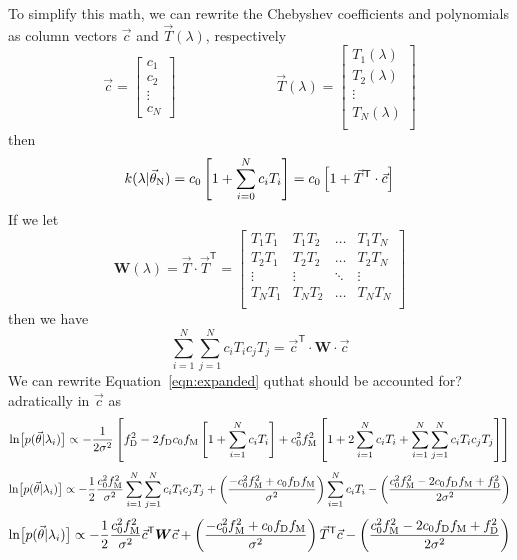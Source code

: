 \documentclass[preprint]{aastex} %
\newcommand{\vt}{\vec{\theta}}
\newcommand{\vN}{\vt_{\rm N}}
\newcommand{\vc}{\vec{c}}
\newcommand{\fM}{f_{\rm M}}
\newcommand{\fD}{f_{\rm D}}
\newcommand{\trans}{\mathsf{T}}
\begin{document}
To simplify this math, we can rewrite the Chebyshev coefficients and polynomials as column vectors $\vc$ and $\vec{T}(\lambda)$, respectively
\begin{equation}
  \vc = 
  \begin{bmatrix}
    c_1\\
    c_2\\
    \vdots\\
    c_N
  \end{bmatrix}
  \hspace{3cm}
\vec{T}(\lambda) = 
\begin{bmatrix}
T_1(\lambda)\\
T_2(\lambda)\\
\vdots\\
T_N(\lambda)\\
\end{bmatrix}
\end{equation}
then 
\begin{equation}
  k(\lambda | \vN) = c_0 \left [ 1 + \sum^N_{i = 0} c_i T_i \right ] = c_0 \left[ 1+ \vec{T}^\trans \cdot \vc \right]
\end{equation}
If we let 
\begin{equation}
  {\bm W}(\lambda) = \vec{T} \cdot \vec{T}^\trans = 
  \begin{bmatrix}
T_1 T_1 & T_1 T_2 &  \hdots & T_1 T_N \\
T_2 T_1 & T_2 T_2 &  \hdots & T_2 T_N \\
\vdots  & \vdots  &  \ddots & \vdots \\
T_N T_1 & T_N T_2 &  \hdots & T_N T_N \\
  \end{bmatrix}
\end{equation}
then we have
\begin{equation}
  \sum_{i =1}^N \sum_{j=1}^N c_i T_i c_j T_j = \vc^\trans \cdot {\bm W} \cdot \vc
\end{equation}
We can rewrite Equation~\ref{eqn:expanded} quthat should be accounted for? adratically in $\vc$ as
\begin{equation}
  \ln \bigl [p(\vt | \lambda_i) \bigr] \propto - \frac{1}{2 \sigma^2} \left [ \fD^2 - 2 \fD c_0 \fM \left [1+ \sum_{i=1}^N c_i T_i \right ]+ c_0^2 \fM^2 \left [1 + 2 \sum_{i=1}^N c_i T_i + \sum_{i=1}^N \sum_{j=1}^N c_i T_i c_j T_j \right ] \right ]
 \end{equation}
\begin{equation}
  \ln \bigl [p(\vt | \lambda_i) \bigr] \propto - \frac{1}{2} \frac{c_0^2 \fM^2}{\sigma^2} \sum_{i=1}^N \sum_{j=1}^N c_i T_i c_j T_j + \left (\frac{- c_0^2 \fM^2 + c_0 \fD \fM}{\sigma^2} \right ) \sum_{i=1}^N c_i T_i  -  \left( \frac{c_0^2 \fM^2 - 2 c_0 \fD \fM + \fD^2}{2 \sigma^2} \right)
\end{equation}
\begin{equation}
  \ln \bigl [p(\vt | \lambda_i) \bigr] \propto - \frac{1}{2} \frac{c_0^2 \fM^2}{\sigma^2}  \vc^\trans {\bm W} \vc + \left (\frac{- c_0^2 \fM^2 + c_0 \fD \fM}{\sigma^2} \right ) \vec{T}^\trans \vc -  \left( \frac{c_0^2 \fM^2 - 2 c_0 \fD \fM + \fD^2}{2 \sigma^2} \right)
\end{equation}
\end{document}
